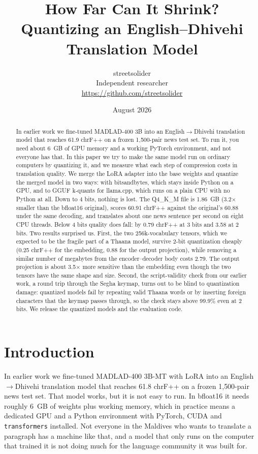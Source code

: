 \documentclass[10pt,twocolumn]{article}
\title{\Large\bf How Far Can It Shrink?\\
Quantizing an English--Dhivehi Translation Model}
\author{streetsolider\\
\small Independent researcher\\
\small \url{https://github.com/streetsolider}}
\date{August 2026}
\begin{document}
\maketitle

\begin{abstract}
In earlier work we fine-tuned MADLAD-400 3B into an English$\to$Dhivehi
translation model that reaches 61.9 chrF++ on a frozen 1{,}500-pair news
test set. To run it, you need about 6~GB of GPU memory and a working
PyTorch environment, and not everyone has that. In this paper we try to
make the same model run on ordinary computers by quantizing it, and we
measure what each step of compression costs in translation quality. We
merge the LoRA adapter into the base weights and quantize the merged
model in two ways: with bitsandbytes, which stays inside Python on a GPU,
and to GGUF k-quants for llama.cpp, which runs on a plain CPU with no
Python at all. Down to 4 bits, nothing is lost. The Q4\_K\_M file is
1.86~GB (3.2$\times$ smaller than the bfloat16 original), scores 60.91
chrF++ against the original's 60.88 under the same decoding, and
translates about one news sentence per second on eight CPU threads. Below
4 bits quality does fall: by 0.79 chrF++ at 3 bits and 3.58 at 2 bits.
Two results surprised us. First, the two 256k-vocabulary tensors, which
we expected to be the fragile part of a Thaana model, survive 2-bit
quantization cheaply (0.25 chrF++ for the embedding, 0.88 for the output
projection), while removing a similar number of megabytes from the
encoder--decoder body costs 2.79. The output projection is about
3.5$\times$ more sensitive than the embedding even though the two tensors
have the same shape and size. Second, the script-validity check from our
earlier work, a round trip through the Segha keymap, turns out to be
blind to quantization damage: quantized models fail by repeating valid
Thaana words or by inserting foreign characters that the keymap passes
through, so the check stays above 99.9\% even at 2 bits. We release the
quantized models and the evaluation code.
\end{abstract}

\section{Introduction}
\label{sec:intro}

In earlier work we fine-tuned MADLAD-400 3B-MT \citep{madlad400} with
LoRA \citep{lora} into an English$\to$Dhivehi translation model that
reaches 61.8 chrF++ on a frozen 1{,}500-pair news test set. That model
works, but it is not easy to run. In bfloat16 it needs roughly 6~GB of
weights plus working memory, which in practice means a dedicated GPU and
a Python environment with PyTorch, CUDA and \texttt{transformers}
installed. Not everyone in the Maldives who wants to translate a
paragraph has a machine like that, and a model that only runs on the
computer that trained it is not doing much for the language community it
was built for.
\end{document}
